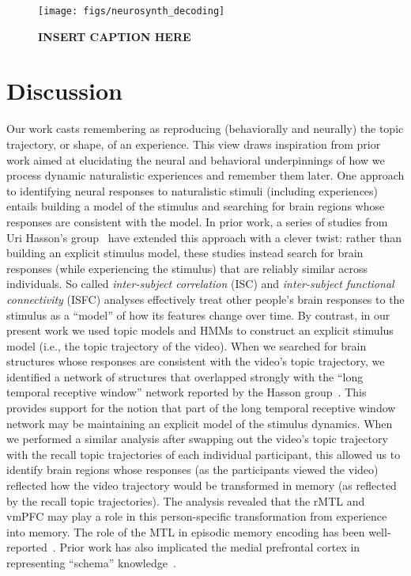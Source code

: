\documentclass{article}
\begin{document}
\begin{figure}[t]
\centering
\texttt{[image: figs/neurosynth\_decoding]}
\caption{\small \textbf{INSERT CAPTION HERE}}
\label{fig:brainz}
\end{figure}
\FloatBarrier



\section*{Discussion}
\label{sec:discussion}

Our work casts remembering as reproducing (behaviorally and neurally) the topic trajectory, or shape, of an experience.  This view draws inspiration from prior work aimed at elucidating the neural and behavioral underpinnings of how we process dynamic naturalistic experiences and remember them later.  One approach to identifying neural responses to naturalistic stimuli (including experiences) entails building a model of the stimulus and searching for brain regions whose responses are consistent with the model.  In prior work, a series of studies from Uri Hasson's group~\citep{LernEtal11, SimoEtal16, ChenEtal17, BaldEtal17, ZadbEtal17} have extended this approach with a clever twist: rather than building an explicit stimulus model, these studies instead search for brain responses (while experiencing the stimulus) that are reliably similar across individuals.  So called \textit{inter-subject correlation} (ISC) and \textit{inter-subject functional connectivity} (ISFC) analyses effectively treat other people's brain responses to the stimulus as a ``model'' of how its features change over time.  By contrast, in our present work we used topic models and HMMs to construct an explicit stimulus model (i.e., the topic trajectory of the video).  When we searched for brain structures whose responses are consistent with the video's topic trajectory, we identified a network of structures that overlapped strongly with the ``long temporal receptive window'' network reported by the Hasson group~\citep[e.g., compare our Fig.~\ref{fig:brainz}A with the map of long temporal receptive window voxels in][]{LernEtal11}.  This provides support for the notion that part of the long temporal receptive window network may be maintaining an explicit model of the stimulus dynamics.  When we performed a similar analysis after swapping out the video's topic trajectory with the recall topic trajectories of each individual participant, this allowed us to identify brain regions whose responses (as the participants viewed the video) reflected how the video trajectory would be transformed in memory (as reflected by the recall topic trajectories).  The analysis revealed that the rMTL and vmPFC may play a role in this person-specific transformation from experience into memory.  The role of the MTL in episodic memory encoding has been well-reported~\citep[e.g., ][]{PallWagn02, DavaEtAl03, RangEtal04a, Dava06, WiltSilv07, DianEtal07, KestEtal13}.  Prior work has also implicated the medial prefrontal cortex in representing ``schema'' knowledge~\citep[i.e., general knowledge about the format of an ongoing experience given prior similar experiences; ][]{KestEtal12, KestEtal13, SchlPres15, GilbMarl17, SpalEtal18}.  
\end{document}
